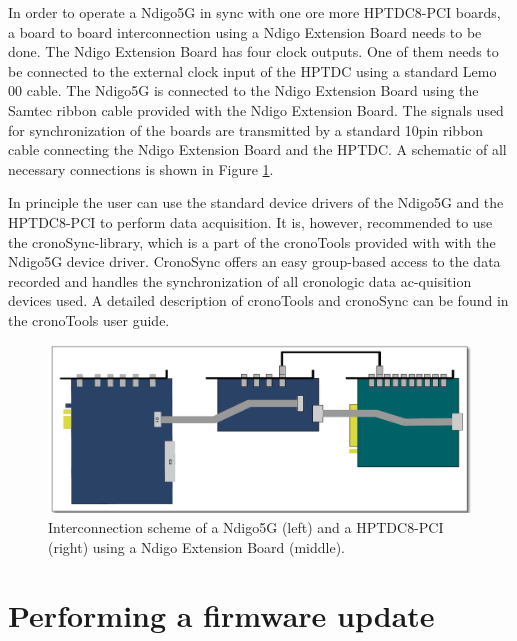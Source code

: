         In order to operate a Ndigo5G in sync with one ore more HPTDC8-PCI boards, a board to board interconnection using a Ndigo Extension Board needs to be done. The Ndigo Extension Board has four clock outputs. One of them needs to be connected to the external clock input of the HPTDC using a standard Lemo 00 cable. The Ndigo5G is connected to the Ndigo Extension Board using the Samtec ribbon cable provided with the Ndigo Extension Board. The signals used for synchronization of the boards are transmitted by a standard 10pin ribbon cable connecting the Ndigo Extension Board and the HPTDC. A schematic of all necessary connections is shown in Figure \ref{fig:InterconNdigo}.\par

        In principle the user can use the standard device drivers of the Ndigo5G and the HPTDC8-PCI to perform data acquisition. It is, however, recommended to use the cronoSync-library, which is a part of the cronoTools provided with with the Ndigo5G device driver. CronoSync offers an easy group-based access to the data recorded and handles the synchronization of all cronologic data ac-quisition devices used. A detailed description of cronoTools and cronoSync can be found in the cronoTools user guide.

        \begin{figure}[hb]
            \begin{center}
                \includegraphics[width=\textwidth]{figures/InterconNdigo.pdf}
                \caption{\label{fig:InterconNdigo} Interconnection scheme of a Ndigo5G (left) and a HPTDC8-PCI (right) using a Ndigo Extension Board (middle).}
            \end{center}
        \end{figure}

    \section{Performing a firmware update}

